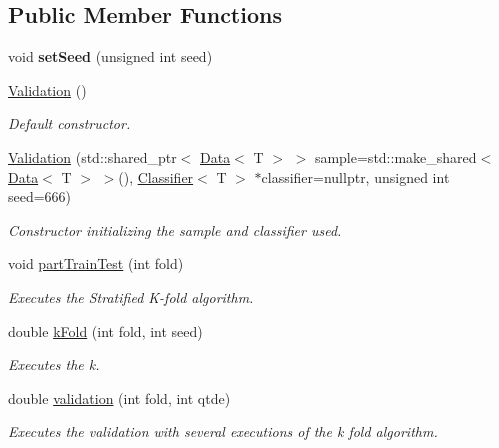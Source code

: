 \subsection*{Public Member Functions}
\begin{DoxyCompactItemize}
\item 
\mbox{\label{class_validation_a26fec6a8582bded0583a4754cdba0009}} 
void {\bfseries set\+Seed} (unsigned int seed)
\item 
\mbox{\label{class_validation_a8421390022d90bebecf761d23533c72e}} 
\hyperlink{class_validation_a8421390022d90bebecf761d23533c72e}{Validation} ()
\begin{DoxyCompactList}\small\item\em Default constructor. \end{DoxyCompactList}\item 
\hyperlink{class_validation_a91399f8b544cb22de02b85618ef5b0cc}{Validation} (std\+::shared\+\_\+ptr$<$ \hyperlink{class_data}{Data}$<$ T $>$ $>$ sample=std\+::make\+\_\+shared$<$ \hyperlink{class_data}{Data}$<$ T $>$ $>$(), \hyperlink{class_classifier}{Classifier}$<$ T $>$ $\ast$classifier=nullptr, unsigned int seed=666)
\begin{DoxyCompactList}\small\item\em Constructor initializing the sample and classifier used. \end{DoxyCompactList}\item 
void \hyperlink{class_validation_a1e9580697a164d4bfbe721f2f1589c57}{part\+Train\+Test} (int fold)
\begin{DoxyCompactList}\small\item\em Executes the Stratified K-\/fold algorithm. \end{DoxyCompactList}\item 
double \hyperlink{class_validation_a1a5825e2dd051a72aaffd423a0df55f1}{k\+Fold} (int fold, int seed)
\begin{DoxyCompactList}\small\item\em Executes the k. \end{DoxyCompactList}\item 
double \hyperlink{class_validation_a94a4eef1571e6e2665d7e8d5df7b20c6}{validation} (int fold, int qtde)
\begin{DoxyCompactList}\small\item\em Executes the validation with several executions of the k fold algorithm. \end{DoxyCompactList}\item 

\end{DoxyCompactItemize}
